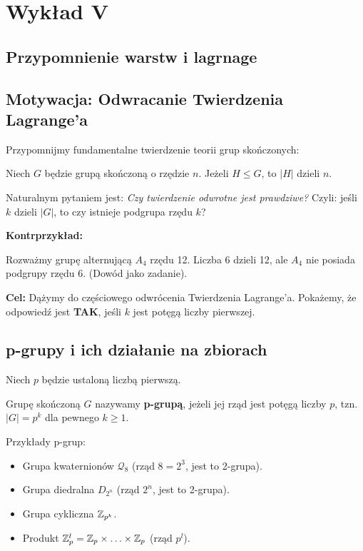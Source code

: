 \chapter{Wykład V}

\section{Przypomnienie warstw i lagrnage}

\section{Motywacja: Odwracanie Twierdzenia Lagrange'a}

Przypomnijmy fundamentalne twierdzenie teorii grup skończonych:

\begin{theorem}
    Niech $G$ będzie grupą skończoną o rzędzie $n$. Jeżeli $H \le G$, to $|H|$ dzieli $n$.
\end{theorem}

Naturalnym pytaniem jest: \textit{Czy twierdzenie odwrotne jest prawdziwe?}
Czyli: jeśli $k$ dzieli $|G|$, to czy istnieje podgrupa rzędu $k$?

\noindent \textbf{Kontrprzykład:}
    
Rozważmy grupę alternującą $A_4$ rzędu 12. Liczba 6 dzieli 12, ale $A_4$ nie posiada podgrupy rzędu 6.
(Dowód jako zadanie).

\textbf{Cel:} Dążymy do częściowego odwrócenia Twierdzenia Lagrange'a. Pokażemy, że odpowiedź jest \textbf{TAK}, jeśli $k$ jest potęgą liczby pierwszej.

\section{p-grupy i ich działanie na zbiorach}

Niech $p$ będzie ustaloną liczbą pierwszą.

\begin{definition}[p-grupa]
    Grupę skończoną $G$ nazywamy \textbf{p-grupą}, jeżeli jej rząd jest potęgą liczby $p$, tzn. $|G| = p^k$ dla pewnego $k \ge 1$.
\end{definition} 

\begin{eg}
    Przykłady p-grup:
    \begin{itemize}
        \item Grupa kwaternionów $\mathcal{Q}_{8}$ (rząd $8=2^3$, jest to 2-grupa).
        \item Grupa diedralna $D_{2^{n}}$ (rząd $2^n$, jest to 2-grupa).
        \item Grupa cykliczna $\mathbb{Z}_{p^{k}}$.
        \item Produkt $\mathbb{Z}_{p}^{l} = \mathbb{Z}_{p}\times \ldots\times \mathbb{Z}_{p}$ (rząd $p^l$).
    \end{itemize}
\end{eg} 

